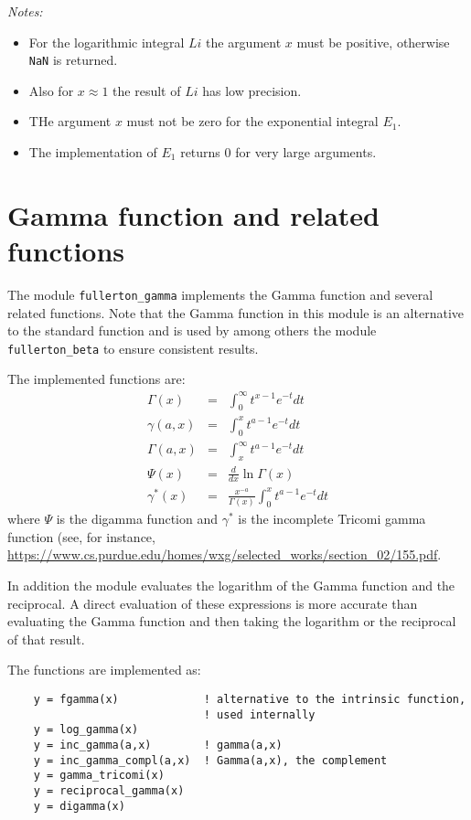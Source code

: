 \documentclass{article}
\begin{document}
\emph{Notes:}
\begin{itemize}
\item
For the logarithmic integral $Li$ the argument $x$ must be positive, otherwise \verb+NaN+ is returned.
\item
Also for $x \approx 1$ the result of $Li$ has low precision.
\item
THe argument $x$ must not be zero for the exponential integral $E_1$.
\item
The implementation of $E_1$ returns 0 for very large arguments.
\end{itemize}


\section{Gamma function and related functions}
The module \verb+fullerton_gamma+ implements the Gamma function and several related functions. Note that
the Gamma function in this module is an alternative to the standard function and is used by among others the
module \verb+fullerton_beta+ to ensure consistent results.

The implemented functions are:
\begin{eqnarray}
    \Gamma(x)   &=& \int^\infty_0 t^{x-1} e^{-t} dt \\
    \gamma(a,x) &=& \int^x_0 t^{a-1} e^{-t} dt      \\
    \Gamma(a,x) &=& \int^\infty_x t^{a-1} e^{-t} dt \\
    \Psi(x)     &=& \frac{d}{dx} \ln \Gamma(x)      \\
    \gamma^*(x) &=& \frac{x^{-a}}{\Gamma(x)} \int^x_0 t^{a-1} e^{-t} dt
\end{eqnarray}
\noindent where $\Psi$ is the digamma function and $\gamma^*$ is the incomplete Tricomi gamma function (see, for instance,
\url{https://www.cs.purdue.edu/homes/wxg/selected_works/section_02/155.pdf}.

In addition the module evaluates the logarithm of the Gamma function and the reciprocal. A direct evaluation
of these expressions is more accurate than evaluating the Gamma function and then taking the logarithm or the reciprocal
of that result.

The functions are implemented as:
\begin{verbatim}
    y = fgamma(x)             ! alternative to the intrinsic function,
                              ! used internally
    y = log_gamma(x)
    y = inc_gamma(a,x)        ! gamma(a,x)
    y = inc_gamma_compl(a,x)  ! Gamma(a,x), the complement
    y = gamma_tricomi(x)
    y = reciprocal_gamma(x)
    y = digamma(x)
\end{verbatim}
\end{document}
